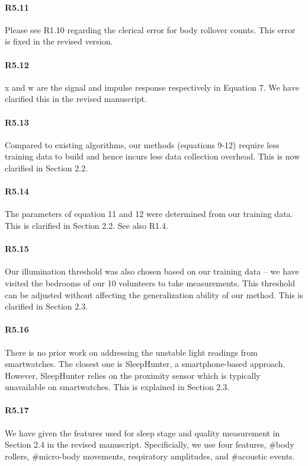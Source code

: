 \paragraph{R5.11} Please see R1.10 regarding the clerical error for body rollover counts. This error is fixed in the revised version.

\paragraph{R5.12} x and w are the signal and impulse response respectively in Equation 7. We have clarified this in the revised manuscript.

\paragraph{R5.13} Compared to existing algorithms, our methods (equations 9-12) require less training data to build and hence incurs less data collection overhead. This is now clarified in Section 2.2.

\paragraph{R5.14} The parameters of equation 11 and 12 were determined from our training data. This is clarified in Section 2.2. See also R1.4.

\paragraph{R5.15} Our illumination threshold was also chosen based on our training data -- we have visited the bedrooms of our 10 volunteers
to take measurements. This threshold can be adjusted without affecting the generalization ability of our method. This is clarified in
Section 2.3.

\paragraph{R5.16} There is no prior work on addressing the unstable light readings from smartwatches. The closest one is SleepHunter, a
smartphone-based approach. However, SleepHunter relies on the proximity sensor which is typically unavailable on smartwatches. This is
explained in Section 2.3.

\paragraph{R5.17} We have given the features used for sleep stage and quality measurement in Section 2.4 in the revised manuscript.
Specificially, we use four features, \#body rollers, \#micro-body movements, respiratory amplitudes, and \#acoustic events.

